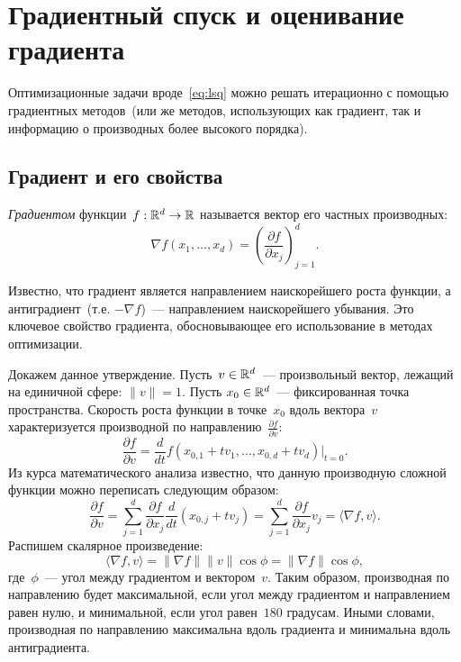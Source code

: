 \documentclass[12pt,fleqn]{article}
\begin{document}
\section{Градиентный спуск и оценивание градиента}

Оптимизационные задачи вроде~\eqref{eq:lsq} можно решать итерационно
с помощью градиентных методов~(или же методов, использующих
как градиент, так и информацию о производных более высокого порядка).

\subsection{Градиент и его свойства}
\emph{Градиентом} функции~$f: \mathbb{R}^d \to \mathbb{R}$ называется вектор его частных производных:
\[
    \nabla f(x_1, \dots, x_d) = \left( \frac{\partial f}{\partial x_j} \right)_{j = 1}^{d}.
\]

Известно, что градиент является направлением наискорейшего роста функции,
а антиградиент~(т.е. $-\nabla f$)~--- направлением наискорейшего убывания.
Это ключевое свойство градиента, обосновывающее его использование в методах оптимизации.

Докажем данное утверждение.
Пусть~$v \in \mathbb{R}^d$~--- произвольный вектор, лежащий на единичной сфере: $\|v\| = 1$.
Пусть $x_0 \in \mathbb{R}^d$~--- фиксированная точка пространства.
Скорость роста функции в точке~$x_0$ вдоль вектора~$v$ характеризуется
производной по направлению~$\frac{\partial f}{\partial v}$:
\[
    \frac{\partial f}{\partial v}
    =
    \frac{d}{dt} f(x_{0,1} + t v_1, \dots, x_{0,d} + t v_d) |_{t = 0}.
\]
Из курса математического анализа известно, что данную производную сложной
функции можно переписать следующим образом:
\[
    \frac{\partial f}{\partial v}
    =
    \sum_{j = 1}^{d}
        \frac{\partial f}{\partial x_j}
        \frac{d}{dt} \left(x_{0,j} + t v_j\right)
    =
    \sum_{j = 1}^{d}
        \frac{\partial f}{\partial x_j}
        v_j
    =
    \langle \nabla f, v \rangle.
\]
Распишем скалярное произведение:
\[
    \langle \nabla f, v \rangle
    =
    \|\nabla f\| \|v\| \cos \phi
    =
    \|\nabla f\| \cos \phi,
\]
где~$\phi$~--- угол между градиентом и вектором~$v$.
Таким образом, производная по направлению будет
максимальной, если угол между градиентом и направлением равен нулю,
и минимальной, если угол равен~$180$ градусам.
Иными словами, производная по направлению максимальна
вдоль градиента и минимальна вдоль антиградиента.
\end{document}
